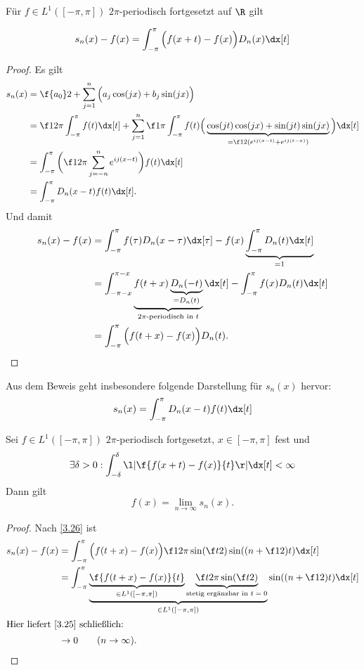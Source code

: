\begin{lem} \label{3.26}
	Für $f \in L^1([-\pi, \pi])$ $2\pi$-periodisch fortgesetzt auf $\R$ gilt

	\begin{align*}
		s_n(x) - f(x) = \int_{-\pi}^{\pi} \Big(f(x+t) - f(x)\Big) D_n(x) \dx[t]
	\end{align*}
	\begin{proof}
		Es gilt
		\begin{align*}
			s_n(x) 
			&= \f {a_0}2 + \sum_{j=1}^n \Big( a_j \cos(jx) + b_j \sin(jx) \Big) \\
			&= \f 1{2 \pi} \int_{-\pi}^{\pi} f(t) \dx[t] + \sum_{j=1}^n \f 1{\pi} \int_{-\pi}^{\pi} f(t) \Big( \underbrace{\cos(jt) \cos(jx) + \sin(jt) \sin(jx)}_{= \f 12 ( e^{ij(x-t)} + e^{ij(t-x)})} \Big) \dx[t] \\
			&= \int_{-\pi}^{\pi} \bigg( \f 1{2\pi} \sum_{j=-n}^n e^{ij(x-t)} \bigg) f(t) \dx[t] \\
			&= \int_{-\pi}^{\pi} D_n(x-t) f(t) \dx[t].
		\end{align*}
		Und damit
		\begin{align*}
			s_n(x) - f(x) 
			&= \int_{-\pi}^{\pi} f(\tau) D_n(x-\tau) \dx[\tau] - f(x) \underbrace{\int_{-\pi}^{\pi} D_n(t) \dx[t]}_{=1} \\
			&= \int_{-\pi-x}^{\pi-x} \underbrace{f(t + x)\underbrace{D_n(-t)}_{=D_n(t)}}_{\text{$2\pi$-periodisch in $t$}} \dx[t] - \int_{-\pi}^\pi f(x) D_n(t) \dx[t] \\
			&= \int_{-\pi}^{\pi} \Big( f(t + x) - f(x) \Big) D_n(t).
		\end{align*}
	\end{proof}
	\begin{note}
		Aus dem Beweis geht insbesondere folgende Darstellung für $s_n(x)$ hervor:
		\begin{align*}
			s_n(x) = \int_{-\pi}^{\pi} D_n(x-t) f(t) \dx[t]
		\end{align*}
	\end{note}
\end{lem}

\begin{st} \label{3.27}
	Sei $f \in L^1([-\pi,\pi])$ $2\pi$-periodisch fortgesetzt, $x \in [-\pi,\pi]$ fest und
	\[
		\exists \delta > 0 : \int_{-\delta}^{\delta} \l| \f{f(x+t)-f(x)}{t} \r| \dx[t] < \infty
	\]
	Dann gilt 
	\[
		f(x) = \lim_{n\to\infty} s_n(x).
	\]
	\begin{proof}
		Nach \ref{3.26} ist
		\begin{align*}
			s_n(x)-f(x)
			&= \int_{-\pi}^\pi \Big( f(t+x)-f(x) \Big) \f 1{2\pi \sin(\f t2)} \sin((n+\f 12) t) \dx[t] \\
			&= \int_{-\pi}^\pi \underbrace{\underbrace{\f {f(t+x)-f(x)}{t}}_{\in L^1([-\pi,\pi])} \underbrace{\f t{2\pi \sin(\f t2)}}_{\text{stetig ergänzbar in $t=0$}}}_{\in L^1([-\pi,\pi])} \sin((n+\f 12) t) \dx[t] \\
			\intertext{Hier liefert \ref{3.25} schließlich:}
			&\to 0 \qquad (n\to \infty).
		\end{align*}
	\end{proof}
\end{st}

